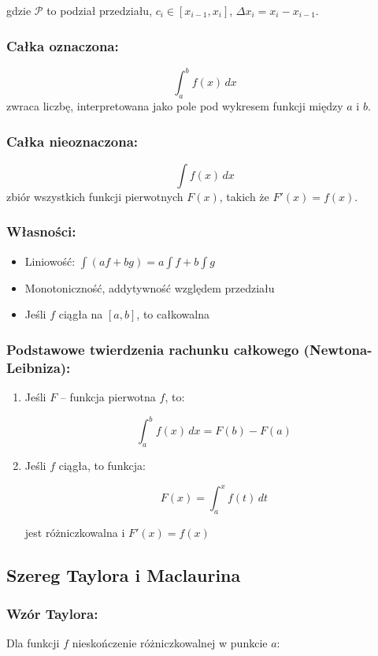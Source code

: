 gdzie $\mathcal{P}$ to podział przedziału, $c_i \in [x_{i-1}, x_i]$, $\Delta x_i = x_i - x_{i-1}$.

\subsubsection*{Całka oznaczona:}

$$
\int_a^b f(x)\,dx
$$
zwraca liczbę, interpretowana jako pole pod wykresem funkcji między $a$ i $b$.

\subsubsection*{Całka nieoznaczona:}

$$
\int f(x)\,dx
$$
zbiór wszystkich funkcji pierwotnych $F(x)$, takich że $F'(x) = f(x)$.

\subsubsection*{Własności:}
\begin{itemize}
    \item Liniowość: $\int (af + bg) = a \int f + b \int g$
    \item Monotoniczność, addytywność względem przedziału
    \item Jeśli $f$ ciągła na $[a, b]$, to całkowalna
\end{itemize}

\subsubsection*{Podstawowe twierdzenia rachunku całkowego (Newtona-Leibniza):}
\begin{enumerate}
    \item Jeśli $F$ -- funkcja pierwotna $f$, to:

    $$
    \int_a^b f(x)\,dx = F(b) - F(a)
    $$
    \item Jeśli $f$ ciągła, to funkcja:

    $$
    F(x) = \int_a^x f(t)\,dt
    $$

    jest różniczkowalna i $F'(x) = f(x)$
\end{enumerate}


\subsection{Szereg Taylora i Maclaurina}

\subsubsection*{Wzór Taylora:}
Dla funkcji $f$ nieskończenie różniczkowalnej w punkcie $a$:

